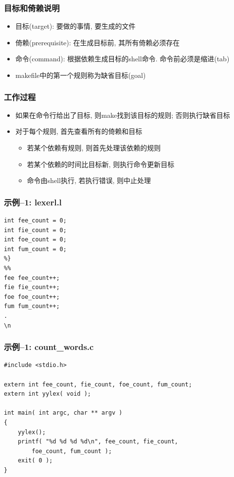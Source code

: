 \documentclass[compress]{beamer}
\begin{document}
\begin{frame}
\frametitle{目标和倚赖说明}

\begin{itemize}
\item 目标(target): 要做的事情, 要生成的文件
\item 倚赖(prerequisite): 在生成目标前, 其所有倚赖必须存在
\item 命令(command): 根据依赖生成目标的shell命令. 命令前必须是缩进(tab)
\item makefile中的第一个规则称为缺省目标(goal)
\end{itemize}

\end{frame}

\begin{frame}
\frametitle{工作过程}
\begin{itemize}
\item 如果在命令行给出了目标, 则make找到该目标的规则; 否则执行缺省目标
\item 对于每个规则, 首先查看所有的倚赖和目标
    \begin{itemize}
    \item 若某个依赖有规则, 则首先处理该依赖的规则
    \item 若某个依赖的时间比目标新, 则执行命令更新目标
    \item 命令由shell执行, 若执行错误, 则中止处理
    \end{itemize}
\end{itemize}


\end{frame}

\begin{frame}[containsverbatim]
\frametitle{示例--1: lexerl.l }

\begin{Verbatim}[label=lexerl.l]
%{
int fee_count = 0;
int fie_count = 0;
int foe_count = 0;
int fum_count = 0;
%}
%%
fee fee_count++;
fie fie_count++;
foe foe_count++;
fum fum_count++;
.
\n
\end{Verbatim}
\end{frame}


\begin{frame}[containsverbatim]
\frametitle{示例--1: count\_words.c}

\begin{Verbatim}[label=count\_words.c]
#include <stdio.h>

extern int fee_count, fie_count, foe_count, fum_count;
extern int yylex( void );

int main( int argc, char ** argv )
{
    yylex();
    printf( "%d %d %d %d\n", fee_count, fie_count,
        foe_count, fum_count );
    exit( 0 );
}
\end{Verbatim}
\end{frame}
\end{document}
